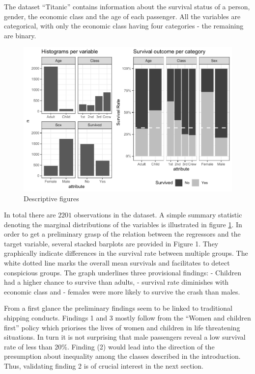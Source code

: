 \documentclass[
]{article}
\begin{document}
The dataset ``Titanic'' contains information about the survival status
of a person, gender, the economic class and the age of each passenger.
All the variables are categorical, with only the economic class having
four categories - the remaining are binary.

\begin{figure}[h]

{\centering \includegraphics{Project-5_files/figure-latex/categories-1} 

}

\caption{Descriptive figures}\label{fig:categories}
\end{figure}

In total there are \(2201\) observations in the dataset. A simple
summary statistic denoting the marginal distributions of the variables
is illustrated in figure \ref{fig:categories}. In order to get a
preliminary grasp of the relation between the regressors and the target
variable, several stacked barplots are provided in Figure 1. They
graphically indicate differences in the survival rate between multiple
groups. The white dotted line marks the overall mean survivals and
facilitates to detect conspicious groups. The graph underlines three
provisional findings: - Children had a higher chance to survive than
adults, - survival rate diminishes with economic class and - females
were more likely to survive the crash than males.

From a first glance the preliminary findings seem to be linked to
traditional shipping conducts. Findings 1 and 3 mostly follow from the
``Women and children first'' policy which priorises the lives of women
and children in life threatening situations. In turn it is not
surprising that male passengers reveal a low survival rate of less than
20\%. Finding (2) would lead into the direction of the presumption about
inequality among the classes described in the introduction. Thus,
validating finding 2 is of crucial interest in the next section.
\end{document}
